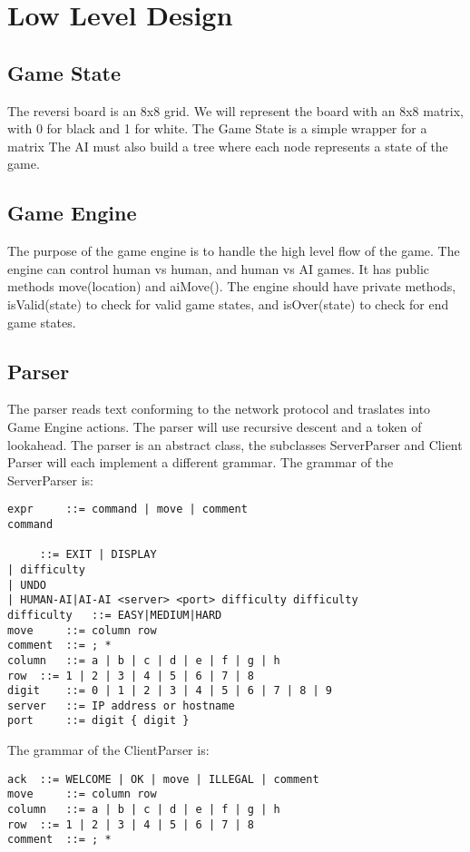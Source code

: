 \documentclass{article}
\begin{document}
\section{Low Level Design}

\subsection{Game State}
The reversi board is an 8x8 grid. We will represent the board with an 8x8 matrix, 
with 0 for black and 1 for white. The Game State is a simple wrapper for a matrix
The AI must also build a tree where each node represents a state of the game.    

\subsection{Game Engine}
The purpose of the game engine is to handle the high level flow of the game. The engine
can control human vs human, and human vs AI games. It has public methods move(location) and aiMove().
The engine should have private methods, isValid(state) to check for valid game states, and isOver(state)
to check for end game states. 

\subsection{Parser}
The parser reads text conforming to the network protocol and traslates into Game Engine actions.
The parser will use recursive descent and a token of lookahead. The parser is an abstract class,
the subclasses ServerParser and Client Parser will each implement a different grammar. 
The grammar of the ServerParser is:
\begin{verbatim}
expr	 ::= command | move | comment
command 
  
 	 ::= EXIT | DISPLAY 
| difficulty 
| UNDO 
| HUMAN-AI|AI-AI <server> <port> difficulty difficulty
difficulty	 ::= EASY|MEDIUM|HARD
move	 ::= column row
comment	 ::= ; *
column	 ::= a | b | c | d | e | f | g | h
row	 ::= 1 | 2 | 3 | 4 | 5 | 6 | 7 | 8
digit	 ::= 0 | 1 | 2 | 3 | 4 | 5 | 6 | 7 | 8 | 9
server	 ::= IP address or hostname
port	 ::= digit { digit }
\end{verbatim}

\vspace{10 mm}
The grammar of the ClientParser is:
\begin{verbatim}
ack	 ::= WELCOME | OK | move | ILLEGAL | comment
move	 ::= column row
column	 ::= a | b | c | d | e | f | g | h
row	 ::= 1 | 2 | 3 | 4 | 5 | 6 | 7 | 8
comment	 ::= ; *
\end{verbatim}
\end{document}
